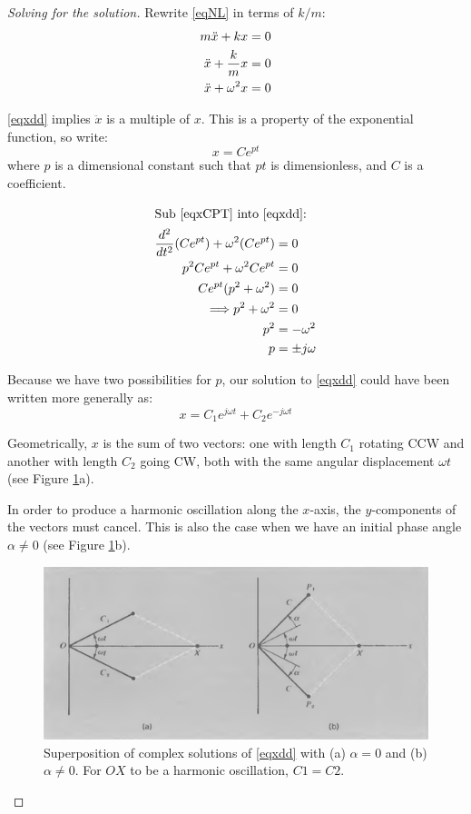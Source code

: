 \documentclass[11pt,letterpaper,titlepage,oneside]{book}
\begin{document}
\begin{proof}[Solving for the solution]
Rewrite \eqref{eqNL} in terms of $k/m$:
\begin{align}
m\ddot{x} + kx &= 0 \notag\\
\ddot{x} + \frac{k}{m}x &= 0 \notag\\
\ddot{x} + \omega^2x  &= 0 \label{eqxdd}
\end{align}

\eqref{eqxdd} implies $\ddot{x}$ is a multiple of $x$. This is a property of the exponential function, so write: 
\begin{equation}
	x=Ce^{pt} \label{eqxCPT}
\end{equation}
where $p$ is a dimensional constant such that $pt$ is dimensionless, and $C$ is a coefficient.

\begin{align*}
\intertext{Sub \eqref{eqxCPT} into \eqref{eqxdd}:}
\frac{d^2}{dt^2}(Ce^{pt})+\omega^2(Ce^{pt}) &= 0\\
p^2Ce^{pt}+\omega^2Ce^{pt}&=0 \\
Ce^{pt}(p^2+\omega^2) &=0 \\
\Longrightarrow p^2 + \omega^2 &= 0 \\
p^2 &= -\omega^2 \\
p &= \pm j\omega
\end{align*}

Because we have two possibilities for $p$, our solution to \eqref{eqxdd} could have been written more generally as:
\[ x = C_1e^{j\omega t}+C_2e^{-j\omega t} \]

Geometrically, $x$ is the sum of two vectors: one with length $C_1$ rotating CCW and another with length $C_2$ going CW, both with the same angular displacement $\omega t$ (see Figure \ref{fig:ch3-complex-sols}a).

In order to produce a harmonic oscillation along the $x$-axis, the $y$-components of the vectors must cancel. This is also the case when we have an initial phase angle $\alpha\neq 0$ (see Figure \ref{fig:ch3-complex-sols}b).

\begin{figure}
\centering
\includegraphics[scale=0.8]{phys232/Ch3-adding-complex-solutions.png} \caption{Superposition of complex solutions of \eqref{eqxdd} with (a) $\alpha=0$ and (b) $\alpha\neq 0$. For $OX$ to be a harmonic oscillation, $C1=C2$.}\label{fig:ch3-complex-sols}
\end{figure}


\end{proof}
\end{document}
